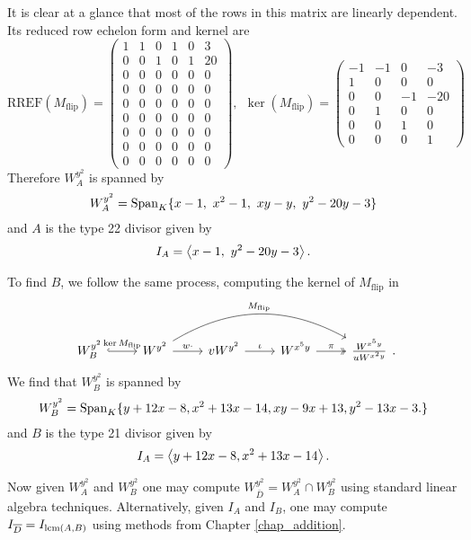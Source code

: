 It is clear at a glance that most of the rows in this matrix are linearly dependent.
Its reduced row echelon form and kernel are
\[ \text{RREF}(M_{\text{flip}}) =
\begin{pmatrix}
  1 &  1 &  0 &  1 &  0 &  3 \\
  0 &  0 &  1 &  0 &  1 & 20 \\
  0 &  0 &  0 &  0 &  0 &  0 \\
  0 &  0 &  0 &  0 &  0 &  0 \\
  0 &  0 &  0 &  0 &  0 &  0 \\
  0 &  0 &  0 &  0 &  0 &  0 \\
  0 &  0 &  0 &  0 &  0 &  0 \\
  0 &  0 &  0 &  0 &  0 &  0 \\
  0 &  0 &  0 &  0 &  0 &  0
\end{pmatrix}, ~~
\ker(M_{\text{flip}}) = 
\begin{pmatrix}
  -1 & -1 &  0 &  -3 \\
   1 &  0 &  0 &   0 \\
   0 &  0 & -1 & -20 \\
   0 &  1 &  0 &   0 \\
   0 &  0 &  1 &   0 \\
   0 &  0 &  0 &   1
\end{pmatrix} \]
Therefore $W_A^{y^2}$ is spanned by
  \[ W_A^{y^2} = \operatorname{Span}_K \{ x - 1, ~x^2 - 1, ~xy - y, ~y^2 - 20y - 3 \} \]
and $A$ is the type 22 divisor given by
  \[I_A = \left\langle x - 1, ~y^2 - 20y - 3 \right\rangle.\]

To find $B$, we follow the same process, computing the kernel of $M_{\text{flip}}$ in
\[ \begin{tikzcd}
  W_B^{y^2} \arrow[hook]{r}{\ker M_{\text{flip}}} &
  W^{y^2} \arrow{r}{w \cdot} \arrow[bend left]{rrr}{M_{\text{flip}}} &
  vW^{y^2} \arrow{r}{\iota} &
  W^{x^5y} \arrow[two heads]{r}{\pi} &
  \frac {W^{x^5y}} {uW^{x^2y}}
\end{tikzcd}. \]
We find that $W_B^{y^2}$ is spanned by
  \[ W_B^{y^2} = \operatorname{Span}_K \{ y + 12x - 8, x^2 + 13x - 14, xy - 9x + 13, y^2 - 13x - 3. \} \]
and $B$ is the type 21 divisor given by
  \[I_A = \left\langle y + 12x - 8, x^2 + 13x - 14 \right\rangle.\]
  
Now given $W_A^{y^2}$ and $W_B^{y^2}$ one may compute $W_{\bar D}^{y^2} = W_A^{y^2} \cap W_B^{y^2}$
using standard linear algebra techniques.
Alternatively, given $I_A$ and $I_B$,
one may compute $I_{\overline D} = I_{\operatorname{lcm}(A,B)}$ using methods from Chapter \ref{chap_addition}.


